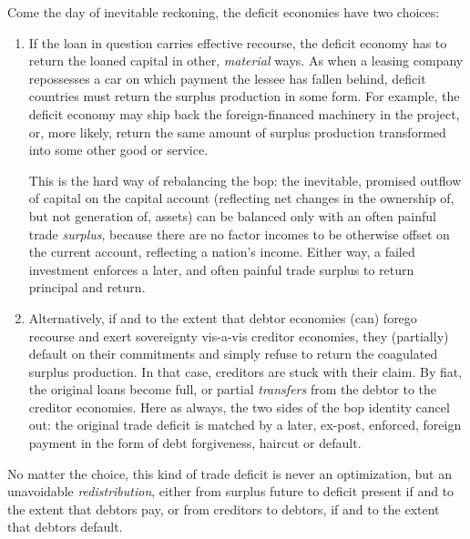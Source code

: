 \begin{description}
\begin{enumerate}
		Come the day of inevitable reckoning, the deficit economies have two choices:

		\begin{enumerate}
			\item If the loan in question carries effective recourse, the deficit economy has to return the loaned capital in other, \emph{material} ways.
			As when a leasing company repossesses a car on which payment the lessee has fallen behind, deficit countries must return the surplus production in some form.
			For example, the deficit economy may ship back the foreign-financed machinery in the project, or, more likely, return the same amount of surplus production transformed into some other good or service.

			This is the hard way of rebalancing the \gls{bop}:
			the inevitable, promised outflow of capital on the capital account (reflecting net changes in the ownership of, but not generation of, assets) can be balanced only with an often painful trade \emph{surplus}, because there are no factor incomes to be otherwise offset on the current account, reflecting a nation's income.
			Either way, a failed investment enforces a later, and often painful trade surplus to return principal and return.

			\item Alternatively, if and to the extent that debtor economies (can) forego recourse and exert sovereignty vis-a-vis creditor economies, they (partially) default on their commitments and simply refuse to return the coagulated surplus production.
			In that case, creditors are stuck with their claim.
			By fiat, the original loans become full, or partial \emph{transfers} from the debtor to the creditor economies.
			Here as always, the two sides of the \gls{bop} identity cancel out:
			the original trade deficit is matched by a later, ex-post, enforced, foreign payment in the form of debt forgiveness, haircut or default.
		\end{enumerate}

		No matter the choice, this kind of trade deficit is never an optimization, but an unavoidable \emph{redistribution}, either from surplus future to deficit present if and to the extent that debtors pay, or from creditors to debtors, if and to the extent that debtors default.


\end{enumerate}
\end{description}
